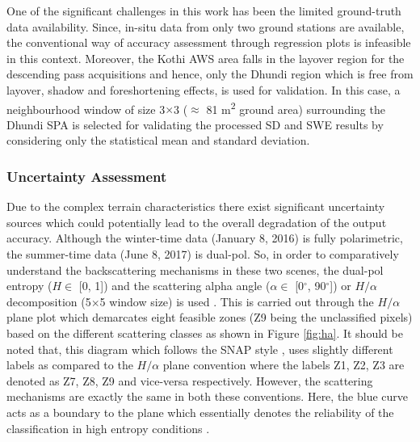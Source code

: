 \documentclass[review]{elsarticle}
\numberwithin{equation}{section}
\numberwithin{figure}{section}
\numberwithin{table}{section}
\begin{document}
One of the significant challenges in this work has been the limited ground-truth data availability. Since, in-situ data from only two ground stations are available, the conventional way of accuracy assessment through regression plots \citep{Kugler2015, Leinss2014, Kumar2017} is infeasible in this context. Moreover, the Kothi AWS area falls in the layover region for the descending pass acquisitions and hence, only the Dhundi region which is free from layover, shadow and foreshortening effects, is used for validation. In this case, a neighbourhood window of size 3$\times$3 ($\approx$ 81 m\textsuperscript{2} ground area) surrounding the Dhundi SPA is selected for validating the processed SD and SWE results by considering only the statistical mean and standard deviation.

\subsubsection{Uncertainty Assessment}
\label{sssec:ua}

Due to the complex terrain characteristics there exist significant uncertainty sources which could potentially lead to the overall degradation of the output accuracy. Although the winter-time data (January 8, 2016) is fully polarimetric, the summer-time data (June 8, 2017) is dual-pol. So, in order to comparatively understand the backscattering mechanisms in these two scenes, the dual-pol entropy ($H \in$ [0, 1]) and the scattering alpha angle ($\alpha \in$ [0$^\circ$, 90$^\circ$]) or $H/{\alpha}$ decomposition (5$\times$5 window size) is used \citep{Cloude2010, Lee2009, Singh2014}. This is carried out through the $H/{\alpha}$ plane plot which demarcates eight feasible zones (Z9 being the unclassified pixels) based on the different scattering classes as shown in Figure \ref{fig:ha}. It should be noted that, this diagram which follows the SNAP style \citep{ESA2018}, uses slightly different labels as compared to the \cite{Lee2009} $H/{\alpha}$ plane convention where
the labels Z1, Z2, Z3 are denoted as Z7, Z8, Z9 and vice-versa respectively. However, the scattering mechanisms are exactly the same in both these conventions. Here, the blue curve acts as a boundary to the plane which essentially denotes the reliability of the classification in high entropy conditions \citep{Brunner2009}.
\end{document}
